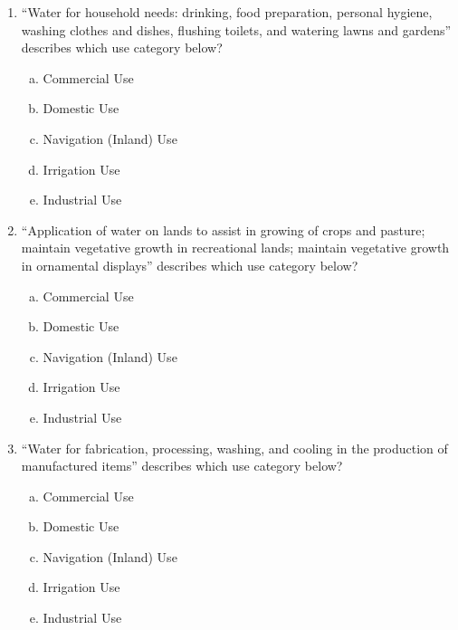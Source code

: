 \documentclass[11pt]{article}
\begin{document}
\clearpage
\begin{enumerate}
\item ``Water for household needs: drinking, food preparation, personal hygiene, washing clothes and dishes, flushing toilets, and watering lawns and gardens'' describes which use category below?
\begin{enumerate}[a)]
\item Commercial Use
\item Domestic Use
\item Navigation (Inland) Use
\item Irrigation Use
\item Industrial Use
\end{enumerate}

\item ``Application of water on lands to assist in growing of crops and pasture; maintain vegetative growth in recreational lands; maintain vegetative growth in ornamental displays'' describes which use category below?
\begin{enumerate}[a)]
\item Commercial Use
\item Domestic Use
\item Navigation (Inland) Use
\item Irrigation Use
\item Industrial Use
\end{enumerate}

\item ``Water for fabrication, processing, washing, and cooling in the production of manufactured items'' describes which use category below?
\begin{enumerate}[a)]
\item Commercial Use
\item Domestic Use
\item Navigation (Inland) Use
\item Irrigation Use
\item Industrial Use
\end{enumerate}



\end{enumerate}
\end{document}
